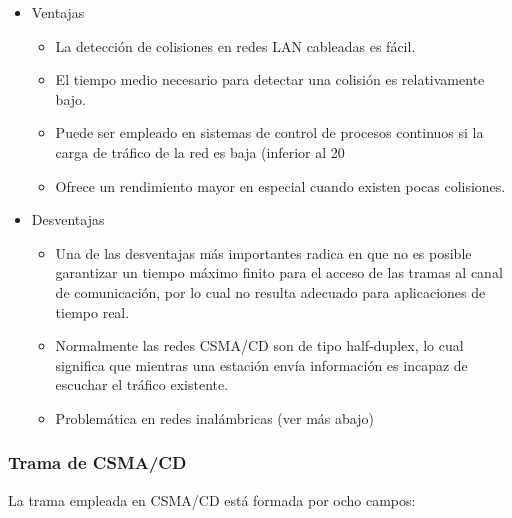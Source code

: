 \documentclass[a4paper]{article}
\begin{document}
	\begin{itemize}
		
		\item Ventajas
		\begin{itemize}
			\item La detección de colisiones en redes LAN cableadas es fácil.
			\item El tiempo medio necesario para detectar una colisión es relativamente bajo.
			\item Puede ser empleado en sistemas de control de procesos continuos si la carga de tráfico de la red es baja (inferior al 20 %
			\item Ofrece un rendimiento mayor en especial cuando existen pocas colisiones.
		\end{itemize}
		
		\item Desventajas
		\begin{itemize}
			\item Una de las desventajas más importantes radica en que no es posible garantizar un tiempo máximo finito para el acceso de las tramas al canal de comunicación, por lo cual no resulta adecuado para aplicaciones de tiempo real.
			\item Normalmente las redes CSMA/CD son de tipo half-duplex, lo cual significa que mientras una estación envía información es incapaz de escuchar el tráfico existente.
			\item Problemática en redes inalámbricas (ver más abajo)
		\end{itemize}
		
	\end{itemize}
	
	\subsubsection{Trama de CSMA/CD}
	
	La trama empleada en CSMA/CD está formada por ocho campos:
	
\end{document}

